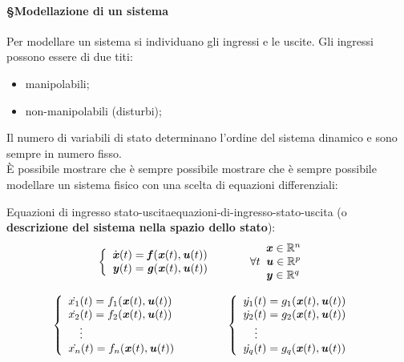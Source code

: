 \documentclass[12pt]{article}
\begin{document}
\paragraph{\S Modellazione di un sistema}\label{par:modellazione-di-un-sistema}
Per modellare un sistema si individuano gli ingressi e le uscite. Gli ingressi possono essere di due titi:
\begin{itemize}
    \item manipolabili;
    \item non-manipolabili (disturbi);
\end{itemize}
Il numero di variabili di stato determinano l'ordine del sistema dinamico e sono sempre in numero fisso. \\
\`E possibile mostrare che \`e sempre possibile mostrare che \`e sempre possibile modellare un sistema fisico con una scelta di equazioni differenziali:
\begin{definition}{Equazioni di ingresso stato-uscita}{equazioni-di-ingresso-stato-uscita}
    (o \textbf{descrizione del sistema nella spazio dello stato}):
    \begin{equation}\label{eq:eq-ingresso-stato-uscita}
        \left\{
            \begin{array}{ll}
                \dot{\textbf{\textit{x}}}(t) = \textbf{\textit{f}}(\textbf{\textit{x}}(t), \textbf{\textit{u}}(t)) & \\
                \textbf{\textit{y}}(t) = \textbf{\textit{g}}(\textbf{\textit{x}}(t), \textbf{\textit{u}}(t)) & \\
            \end{array}
    \right. \quad\quad \forall t \begin{array}{ll}
            \textbf{\textit{x}} \in \mathbb{R}^n & \\
            \textbf{\textit{u}} \in \mathbb{R}^p & \\
            \textbf{\textit{y}} \in \mathbb{R}^q & \\
        \end{array}
    \end{equation}
\end{definition}
\begin{align*}
    \left\{ \begin{array}{ll}
            \dot{x_1}(t) = f_1(\textbf{\textit{x}}(t), \textbf{\textit{u}}(t)) & \\
            \dot{x_2}(t) = f_2(\textbf{\textit{x}}(t), \textbf{\textit{u}}(t)) & \\
            \quad\vdots & \\
            \dot{x_n}(t) = f_n(\textbf{\textit{x}}(t), \textbf{\textit{u}}(t)) & \\
        \end{array}
        \right. \quad\quad\quad \left\{ \begin{array}{ll}
            \dot{y_1}(t) = g_1(\textbf{\textit{x}}(t), \textbf{\textit{u}}(t)) & \\
            \dot{y_2}(t) = g_2(\textbf{\textit{x}}(t), \textbf{\textit{u}}(t)) & \\
            \quad\vdots & \\
            \dot{y_q}(t) = g_q(\textbf{\textit{x}}(t), \textbf{\textit{u}}(t)) & \\
        \end{array}
    \right.
\end{align*}
\end{document}
